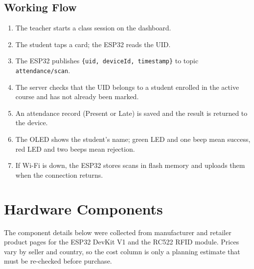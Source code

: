 \documentclass[11pt,a4paper]{article}
\begin{document}
\subsection{Working Flow}
\begin{enumerate}[noitemsep]
  \item The teacher starts a class session on the dashboard.
  \item The student taps a card; the ESP32 reads the UID.
  \item The ESP32 publishes \texttt{\{uid, deviceId, timestamp\}} to topic \texttt{attendance/scan}.
  \item The server checks that the UID belongs to a student enrolled in the active course and has not already been marked.
  \item An attendance record (Present or Late) is saved and the result is returned to the device.
  \item The OLED shows the student's name; green LED and one beep mean success, red LED and two beeps mean rejection.
  \item If Wi-Fi is down, the ESP32 stores scans in flash memory and uploads them when the connection returns.
\end{enumerate}
 
\section{Hardware Components}
The component details below were collected from manufacturer and retailer product pages for the ESP32 DevKit V1 and the RC522 RFID module. Prices vary by seller and country, so the cost column is only a planning estimate that must be re-checked before purchase.
 
\end{document}
